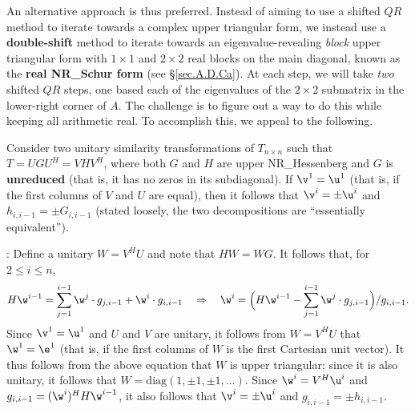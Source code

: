 \begin{figure*}[t]
\end{figure*}

\noindent An alternative approach is thus preferred.  Instead of aiming to use a shifted $QR$ method to iterate towards a complex upper triangular form,
we instead use a {\bf double-shift} method to iterate towards an eigenvalue-revealing {\it block} upper triangular form with $1\times 1$ and $2\times 2$ real blocks on the
main diagonal, known as the {\bf real NR_Schur form} (see \S \ref{sec.A.D.Ca}).  At each step, we will take {\it two} shifted $QR$ steps, one based each of the eigenvalues of the $2\times 2$ submatrix in the
lower-right corner of $A$.  The challenge is to figure out a way to do this while keeping all arithmetic real.  To accomplish this, we appeal to the following.

\begin{fact} \label{fact.implicitQ}
Consider two unitary similarity transformations of $T_{n\times n}$ such that\break $T = U G U^H = V H V^H$, where both $G$ and $H$ are upper NR_Hessenberg and $G$ is {\bf unreduced} (that is, it has no zeros
in its subdiagonal).  If $\v^1=\u^1$ (that is, if the first columns of $V$ and $U$ are equal), then it follows that $\v^i=\pm\u^i$ and $h_{i,i-1}=\pm G_{i,i-1}$ (stated loosely, the two decompositions
are ``essentially equivalent'').
\end{fact}

\/: Define a unitary $W=V^H U$ and note that $HW = WG$.   It follows that, for $2\le i\le n$,
\begin{equation*}
H\w^{i-1} = \sum_{j=1}^{i-1} \w^j \cdot g_{j,i-1}  + \w^i \cdot g_{i,i-1} \quad \Rightarrow \quad \w^i = \Big( H\w^{i-1} - \sum_{j=1}^{i-1} \w^j \cdot g_{j,i-1} \Big)/ g_{i,i-1}.
\end{equation*}
Since $\v^1=\u^1$ and $U$ and $V$ are unitary, it follows from $W=V^H U$ that $\w^1=\e^1$ (that is, if the first columns of $W$ is the first Cartesian unit vector).
It thus follows from the above equation that $W$ is upper triangular; since it is also unitary, it follows that $W=\textrm{diag}(1,\pm 1,\pm 1,\ldots)$.
Since $\w^i=V^H \u^i$ and $g_{i,i-1}=(\w^i)^H H \w^{i-1}$, it also follows that $\v^i=\pm \u^i$ and $g_{i,i-1}=\pm h_{i,i-1}$.  \endproof

